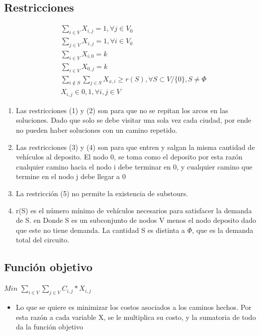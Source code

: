 \documentclass[letter, 10pt]{article}
\begin{document}
\subsection{Restricciones}

\begin{align}
 &\displaystyle\sum_{i \in V}X_{i,j} = 1, \forall j \in V_{0} \\
 &\displaystyle\sum_{j \in V}X_{i,j} = 1, \forall i \in V_{0} \\
 &\displaystyle\sum_{i \in V}X_{i,0} = k \\
 &\displaystyle\sum_{i \in V}X_{0,j} = k \\
 &\displaystyle\sum_{i \not\in S}\sum_{j \in S}X_{x,i} \geq r(S), \forall S \subset V/\{0\}, S \neq \Phi  \\
 &X_{i,j} \in {0,1}, \forall i,j \in V
\end{align}

\begin{enumerate}
 \item Las restricciones (1) y (2) son para que no se repitan los arcos en las soluciones. Dado que solo se debe visitar una sola vez cada ciudad, por ende no pueden haber soluciones con un camino repetido.
 \item Las restricciones (3) y (4) son para que entren y salgan la misma cantidad de veh\'iculos al deposito. El nodo 0, se toma como el deposito por esta raz\'on cualquier  camino hacia el nodo i debe terminar en 0, y
 cualquier camino que termine en el nodo j debe llegar a 0
 \item La restricci\'on (5) no permite la existencia de substours.
 \item r(S) es el n\'umero m\'inimo de veh\'iculos necesarios para satisfacer la demanda de S. en Donde S es un subconjunto de nodos V menos el nodo deposito dado que este no tiene demanda. 
 La cantidad S es distinta a $\Phi$, que es la demanda total del circuito\cite{Toth2002487}.
 
 
\end{enumerate}

\subsection{Funci\'on objetivo}

\begin{center}
$Min$ $\displaystyle\sum_{i \in V}\sum_{j \in V} C_{i,j}*X_{i,j}$
\end{center}
\begin{itemize}
 \item Lo que se quiere es minimizar los costos asociados a los caminos hechos. Por esta raz\'on a cada variable X, se le multiplica su costo, y la sumatoria de todo da la funci\'on objetivo
\end{itemize}
\end{document}

